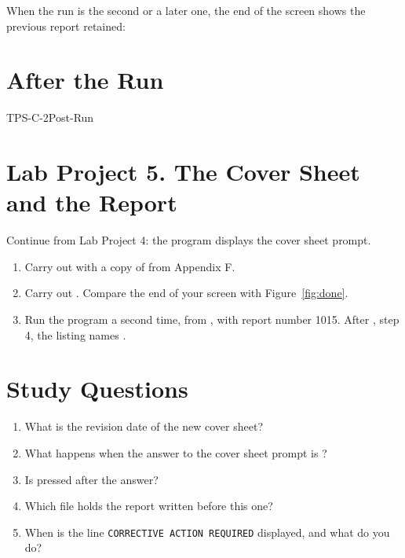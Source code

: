 When the run is the second or a later one, the end of the screen shows the
previous report retained:


\section{After the Run}
\begin{Checklist}{TPS-C-2}{Post-Run}
\end{Checklist}

\section{Lab Project 5. The Cover Sheet and the Report}
Continue from Lab Project 4: the program displays the cover sheet prompt.
\begin{enumerate}
\item Carry out  with a copy of  from Appendix F.
\item Carry out .  Compare the end of your screen with
  Figure~\ref{fig:done}.
\item Run the program a second time, from , with report number
  1015.  After , step 4, the listing names .
\end{enumerate}

\section{Study Questions}
\begin{enumerate}
\item What is the revision date of the new cover sheet?
\item What happens when the answer to the cover sheet prompt is ?
\item Is  pressed after the answer?
\item Which file holds the report written before this one?
\item When is the line \texttt{CORRECTIVE ACTION REQUIRED} displayed, and
  what do you do?
\end{enumerate}
